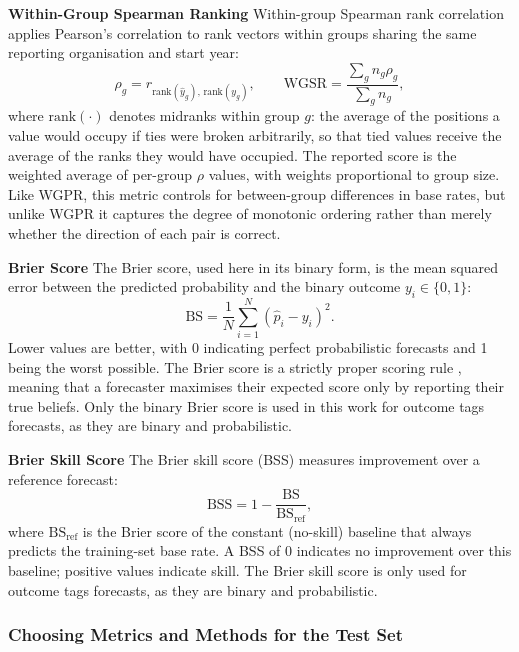 \documentclass[12pt,a4paper]{article}
\let\citep\parencite
\begin{document}
\textbf{Within-Group Spearman Ranking}
Within-group Spearman rank correlation applies Pearson's correlation to rank vectors within groups sharing the same reporting organisation and start year:
\[
  \rho_g = r_{\mathrm{rank}(\hat{y}_g),\, \mathrm{rank}(y_g)}, \qquad \mathrm{WGSR} = \frac{\sum_g n_g \rho_g}{\sum_g n_g},
\]
where $\mathrm{rank}(\cdot)$ denotes midranks within group $g$: the average of the positions a value would occupy if ties were broken arbitrarily, so that tied values receive the average of the ranks they would have occupied. The reported score is the weighted average of per-group $\rho$ values, with weights proportional to group size. Like WGPR, this metric controls for between-group differences in base rates, but unlike WGPR it captures the degree of monotonic ordering rather than merely whether the direction of each pair is correct.

\textbf{Brier Score}
The Brier score, used here in its binary form, is the mean squared error between the predicted probability and the binary outcome $y_i \in \{0,1\}$:
\[
  \mathrm{BS} = \frac{1}{N}\sum_{i=1}^{N}(\hat{p}_i - y_i)^2.
\]
Lower values are better, with 0 indicating perfect probabilistic forecasts and 1 being the worst possible. The Brier score is a strictly proper scoring rule \citep{gneitingStrictlyProperScoring2007}, meaning that a forecaster maximises their expected score only by reporting their true beliefs. Only the binary Brier score is used in this work for outcome tags forecasts, as they are binary and probabilistic.

\textbf{Brier Skill Score}
The Brier skill score (BSS) measures improvement over a reference forecast:
\[
  \mathrm{BSS} = 1 - \frac{\mathrm{BS}}{\mathrm{BS}_{\mathrm{ref}}},
\]
where $\mathrm{BS}_{\mathrm{ref}}$ is the Brier score of the constant (no-skill) baseline that always predicts the training-set base rate. A BSS of 0 indicates no improvement over this baseline; positive values indicate skill. The Brier skill score is only used for outcome tags forecasts, as they are binary and probabilistic.
\subsubsection{Choosing Metrics and Methods for the Test Set}
\end{document}
